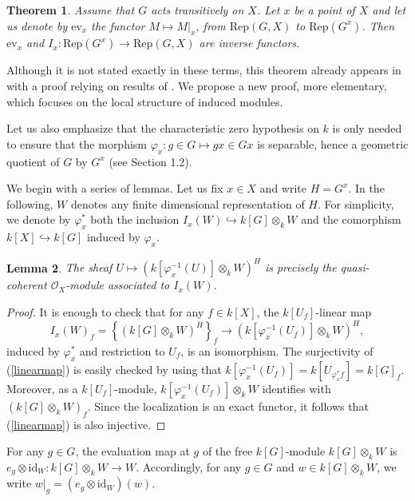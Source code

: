\documentclass{amsart}
\newtheorem{theorem}{Theorem}
\newtheorem{lemma}[theorem]{Lemma}
\theoremstyle{definition}
\begin{document}
\begin{theorem}\label{equivalence}
    Assume that $G$ acts transitively on $X$. Let $x$ be a point of $X$ and let us denote by $\mathrm{ev}_x$ the functor $M \mapsto M|_x$, from $\mathrm{Rep}(G,X)$ to $\mathrm{Rep}(G^x)$. Then $\mathrm{ev}_x$ and $I_x : \mathrm{Rep}(G^x) \to \mathrm{Rep}(G,X)$ are inverse functors.
\end{theorem}

Although it is not stated exactly in these terms, this theorem already appears in \cite{2authors} with a proof relying on results of \cite{3authors}. We propose a new proof, more elementary, which focuses on the local structure of induced modules.

Let us also emphasize that the characteristic zero hypothesis on $k$ is only needed to ensure that the morphism $\varphi_x : g \in G \mapsto gx \in Gx$ is separable, hence a geometric quotient of $G$ by $G^x$ (see Section 1.2).

 We begin with a series of lemmas. Let us fix $x \in X$ and write $H = G^x$. In the following, $W$ denotes any finite dimensional representation of $H$. For simplicity, we denote by $\varphi_x^*$ both the inclusion $I_x(W) \hookrightarrow k[G]\otimes_k W$ and the comorphism $k[X] \hookrightarrow k[G]$ induced by $\varphi_x$.

\begin{lemma}
     The sheaf $U \mapsto (k[\varphi_x^{-1}(U)]\otimes_k W)^H$ is precisely the quasi-coherent $\mathscr{O}_X$-module associated to $I_x(W)$.
\end{lemma}

\begin{proof}
    It is enough to check that for any $f \in k[X]$, the $k[U_f]$-linear map \begin{equation}\label{linearmap} I_x(W)_f = \left\{(k[G] \otimes_k W)^H\right\}_{f}  \longrightarrow (k[\varphi_x^{-1}(U_{f})]\otimes_k W)^H,\end{equation} induced by $\varphi_x^*$ and restriction to $U_f$, is an isomorphism. The surjectivity of (\ref{linearmap}) is easily checked by using that $k[\varphi_x^{-1}(U_f)] = k[U_{\varphi_x^*f}] = k[G]_{f}$. Moreover, as a $k[U_f]$-module, $k[\varphi_x^{-1}(U_f)] \otimes_k W$ identifies with $(k[G] \otimes_k W)_{f}$. Since the localization is an exact functor, it follows that (\ref{linearmap}) is also injective. 
\end{proof}

For any $g \in G$, the evaluation map at $g$ of the free $k[G]$-module $k[G] \otimes_k W$ is $e_g \otimes \mathrm{id}_W : k[G] \otimes_k W \to W$. Accordingly, for any $g \in G$ and $w \in k[G] \otimes_k W $, we write $w |_g = (e_g \otimes \mathrm{id}_W)(w)$. 
\end{document}
